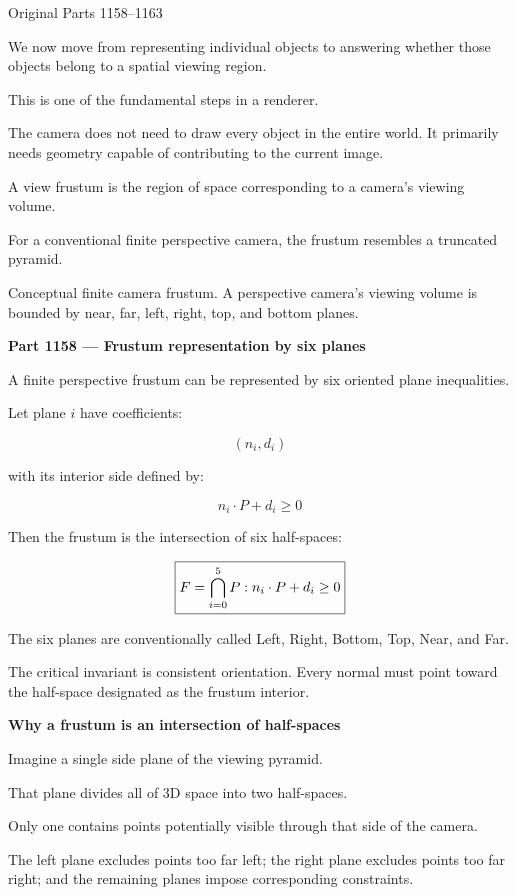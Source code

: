 \hypertarget{03-visual-computing-i-ch021-frusta-planes-and-visibility-classification}{}

Original Parts 1158--1163

We now move from representing individual objects to answering whether those objects belong to a spatial viewing region.

This is one of the fundamental steps in a renderer.

The camera does not need to draw every object in the entire world. It primarily needs geometry capable of contributing to the current image.

A view frustum is the region of space corresponding to a camera's viewing volume.

For a conventional finite perspective camera, the frustum resembles a truncated pyramid.

Conceptual finite camera frustum. A perspective camera's viewing volume is bounded by near, far, left, right, top, and bottom planes.

\textbf{Part 1158 --- Frustum representation by six planes}

A finite perspective frustum can be represented by six oriented plane inequalities.

Let plane \(i\) have coefficients:

\[
(n_i,d_i)
\]

with its interior side defined by:

\[
n_i\cdot P+d_i\ge0
\]

Then the frustum is the intersection of six half-spaces:

\[
\boxed{ F=\bigcap_{i=0}^{5} \\{P:n_i\cdot P+d_i\ge0\\} }
\]

The six planes are conventionally called Left, Right, Bottom, Top, Near, and Far.

The critical invariant is consistent orientation. Every normal must point toward the half-space designated as the frustum interior.

\textbf{Why a frustum is an intersection of half-spaces}

Imagine a single side plane of the viewing pyramid.

That plane divides all of 3D space into two half-spaces.

Only one contains points potentially visible through that side of the camera.

The left plane excludes points too far left; the right plane excludes points too far right; and the remaining planes impose corresponding constraints.

